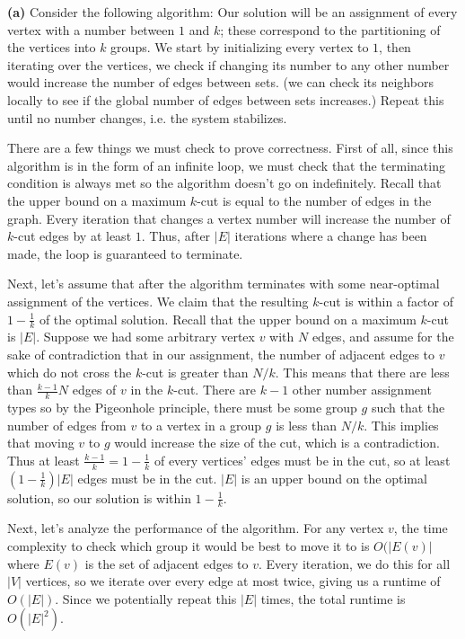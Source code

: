 \documentclass[11pt,letterpaper]{article}
\begin{document}
\begin{solution}
    \textbf{(a)} Consider the following algorithm: Our solution will be an assignment of every vertex with a number between $1$ and $k$; these correspond to the partitioning of the vertices into $k$ groups. We start by initializing every vertex to $1$, then iterating over the vertices, we check if changing its number to any other number would increase the number of edges between sets. (we can check its neighbors locally to see if the global number of edges between sets increases.) Repeat this until no number changes, i.e. the system stabilizes.

    There are a few things we must check to prove correctness. First of all, since this algorithm is in the form of an infinite loop, we must check that the terminating condition is always met so the algorithm doesn't go on indefinitely. Recall that the upper bound on a maximum $k$-cut is equal to the number of edges in the graph. Every iteration that changes a vertex number will increase the number of $k$-cut edges by at least $1$. Thus, after $|E|$ iterations where a change has been made, the loop is guaranteed to terminate.

    Next, let's assume that after the algorithm terminates with some near-optimal assignment of the vertices. We claim that the resulting $k$-cut is within a factor of $1-\frac1k$ of the optimal solution. Recall that the upper bound on a maximum $k$-cut is $|E|$. Suppose we had some arbitrary vertex $v$ with $N$ edges, and assume for the sake of contradiction that in our assignment, the number of adjacent edges to $v$ which do not cross the $k$-cut is greater than $N/k$. This means that there are less than $\frac{k-1}{k}N$ edges of $v$ in the $k$-cut. There are $k-1$ other number assignment types so by the Pigeonhole principle, there must be some group $g$ such that the number of edges from $v$ to a vertex in a group $g$ is less than $N/k$. This implies that moving $v$ to $g$ would increase the size of the cut, which is a contradiction. Thus at least $\frac{k-1}{k}=1-\frac{1}{k}$ of every vertices' edges must be in the cut, so at least $\left(1-\frac{1}{k}\right)|E|$ edges must be in the cut. $|E|$ is an upper bound on the optimal solution, so our solution is within $1-\frac{1}{k}$.

    Next, let's analyze the performance of the algorithm. For any vertex $v$, the time complexity to check which group it would be best to move it to is $O(|E(v)|$ where $E(v)$ is the set of adjacent edges to $v$. Every iteration, we do this for all $|V|$ vertices, so we iterate over every edge at most twice, giving us a runtime of $O(|E|)$. Since we potentially repeat this $|E|$ times, the total runtime is $O(|E|^2)$.


\end{solution}
\end{document}

